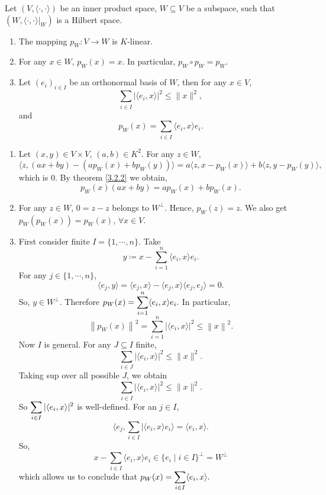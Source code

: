 \begin{propositionenv}[Parseval]
    Let $\left(V,\langle \cdot, \cdot\rangle\right)$ be an inner product space, $W\subseteq V$ be a subspace, such that $\left(W,\langle\cdot,\cdot\rangle|_W\right)$ is a Hilbert space.
    \begin{enumerate}
        \item The mapping $p_W : V\rightarrow W$ is $K$-linear.
        \item For any $x\in W$, $p_W(x) = x$. In particular, $p_W\circ p_W = p_W$.
        \item Let $\left(e_i\right)_{i\in I}$ be an orthonormal basis of $W$, then for any $x\in V$,
        $$ \sum_{i\in I} |\langle e_i, x\rangle|^2 \le \| x\|^2,$$
        and 
        $$ p_W(x) = \sum_{i\in I} \langle e_i, x\rangle e_i.$$
    \end{enumerate}
\end{propositionenv}
\begin{proofenv}
    \quad
    \begin{enumerate}
        \item Let $(x,y)\in V\times V$, $(a,b)\in K^2$. For any $z\in W$,
        $$ \langle z,\left(ax +by\right) - \left(a p_W(x) + bp_W(y)\right)\rangle = a\langle z, x - p_W(x)\rangle + b\langle z, y - p_W(y)\rangle,$$
        which is $0$. By theorem \ref{3.2.2} we obtain,
        $$p_W(x) (ax + by) = ap_W(x) + bp_W(x).$$
        \item For any $z\in W$, $0 = z-z$ belongs to $W^\perp$. Hence, $p_W(z) = z$.
        We also get $p_W(p_W(x)) = p_W(x)$, $\forall x\in V$.
        \item First consider finite $I=\{1,\cdots,n\}$. Take
        $$ y\coloneq x - \sum_{i=1}^{n} \langle e_i , x\rangle e_i.$$
        For any $j \in \{1,\cdots ,n\}$,
        $$ \langle e_j,y \rangle = \langle e_j, x\rangle - \langle e_j, x\rangle \langle e_j,e_j\rangle = 0.$$
        So, $y\in W^\perp$. Therefore $\displaystyle p_W(x) = \sum_{i=1}^{n} \langle e_i,x\rangle e_i.$
        In particular,
        $$ \left\| p_W(x)\right\|^2 = \sum_{i=1}^{n} \left|\langle e_i,x\rangle\right|^2 \le \left\|x\right\|^2.$$
        Now $I$ is general. For any $J\subseteq I$ finite,
        $$ \sum_{i\in J} |\langle e_i,x\rangle|^2 \le \|x\|^2.$$
        Taking sup over all possible $J$, we obtain
        $$ \sum_{i\in I} |\langle e_i,x\rangle|^2 \le \|x\|^2.$$
        So $\displaystyle \sum_{i\in I} |\langle e_i,x\rangle|^2 $ is well-defined.
        For an $j\in I$, 
        $$ \langle e_j,\sum_{i\in I} |\langle e_i,x\rangle e_i\rangle = \langle e_i,x\rangle.$$
        So, 
        $$ x - \sum_{i\in I} \langle e_i, x\rangle e_i \in \{e_i \mid i\in I\}^\perp = W^\perp$$
        which allows us to conclude that $\displaystyle p_W(x) = \sum_{i\in I} \langle e_i,x\rangle.$
    \end{enumerate}
\end{proofenv}

